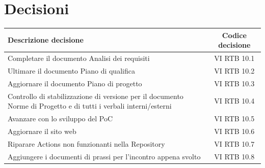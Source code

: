 \documentclass[a4paper,12pt]{article}
\newcommand{\ignoreglossary}{}
\begin{document}
\section{Decisioni}
\begin{center}
\small
\renewcommand{\arraystretch}{1.2} 
\begin{tabular}{|p{}|c|}
\hline
\rowcolor{gray!60} 
\textbf{Descrizione decisione} & \textbf{Codice decisione} \\
\hline
\rowcolor{white}
Completare il documento Analisi dei requisiti & VI \ignoreglossary{RTB} 10.1 \\
\hline
\rowcolor{gray!20}
Ultimare il documento Piano di qualifica & VI \ignoreglossary{RTB} 10.2 \\
\hline
\rowcolor{white}
Aggiornare il documento Piano di progetto & VI \ignoreglossary{RTB} 10.3 \\
\hline
\rowcolor{gray!20}
Controllo di stabilizzazione di versione per il documento Norme di Progetto e di tutti i verbali interni/esterni & VI \ignoreglossary{RTB} 10.4 \\
\hline
\rowcolor{white}
Avanzare con lo sviluppo del PoC & VI \ignoreglossary{RTB} 10.5 \\
\hline
\rowcolor{gray!20}
Aggiornare il sito web & VI \ignoreglossary{RTB} 10.6 \\
\hline
\rowcolor{white}
Riparare Actions non funzionanti nella Repository & VI \ignoreglossary{RTB} 10.7 \\
\hline
\rowcolor{gray!20}
Aggiungere i documenti di prassi per l'incontro appena svolto & VI \ignoreglossary{RTB} 10.8 \\
\hline
\end{tabular}
\end{center}
\pagebreak
\end{document}
